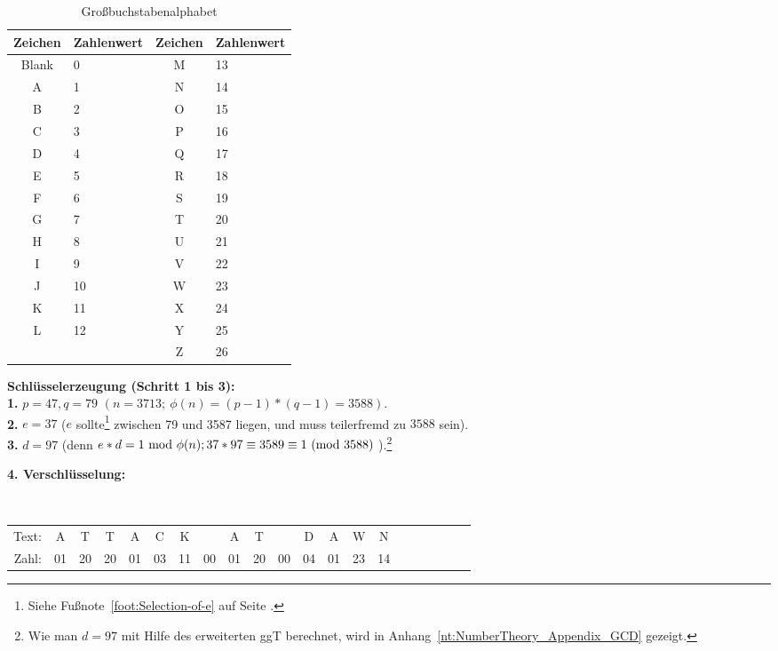 \begin{refsegment}
\begin{table}[ht]
\begin{center}
\begin{tabular}{|c|l||c|l|}
\hline
Zeichen & Zahlenwert & Zeichen & Zahlenwert\\
\hline
\hline
Blank    & 0   & M    & 13\\
A        & 1   & N    & 14\\
B        & 2   & O    & 15\\
C        & 3   & P    & 16\\
D        & 4   & Q    & 17\\
E        & 5   & R    & 18\\
F        & 6   & S    & 19\\
G        & 7   & T    & 20\\
H        & 8   & U    & 21\\
I        & 9   & V    & 22\\
J       & 10   & W    & 23\\
K       & 11   & X    & 24\\
L       & 12   & Y    & 25\\
&              & Z    & 26\\
\hline
\end{tabular}
\end{center}
\hypertarget{Grossbuchstaben-Alphabet}{}
\caption{Großbuchstabenalphabet}
\label{alphacode}
\end{table}

\noindent \textbf{Schlüsselerzeugung (Schritt 1 bis 3):}\\
\textbf{1.} $p=47, q=79$ $( n= 3713;~ \phi(n) = (p-1)*(q-1)=3588).$\\
\textbf{2.} $e=37$ ($e$ sollte\footnote{%
                Siehe Fußnote~\ref{foot:Selection-of-e} auf Seite
                \pageref{foot:Selection-of-e}.}  zwischen 79 und 3587 liegen,
                und muss teilerfremd
                zu $3588$ sein).\\
\textbf{3.} $d=97$ (denn $e*d=1{\rm ~mod~}\phi(n); 37*97 \equiv 3589
\equiv 1{\rm ~(mod~}3588) \;$).\footnote{%
  Wie man $d = 97$ mit Hilfe des erweiterten ggT berechnet, wird in
  Anhang~\ref{nt:NumberTheory_Appendix_GCD} gezeigt.
}

\noindent \textbf{4. Verschlüsselung:}\\
{\tt
\begin{tabular}{rcccccccccccccccccccc}
{\rm Text:} & A & T & T & A & C & K & & A & T &  & D & A & W & N\\
{\rm Zahl:} & 01 & 20 & 20 & 01 & 03 & 11 & 00 & 01 & 20 & 00 & 04 & 01 & 23 & 14
\end{tabular}
}


\end{refsegment}
